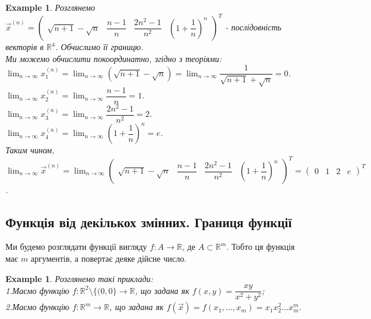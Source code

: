 \documentclass[a4paper, 10pt]{article}
\def\huge{\displaystyle}
\theoremstyle{theoremdd}
\theoremstyle{theoremdd}
\theoremstyle{theoremdd}
\theoremstyle{theoremdd}
\newtheorem{example}[theorem]{Example}
\theoremstyle{theoremdd}
\theoremstyle{theoremdd}
\theoremstyle{theoremdd}
\theoremstyle{theoremdd}
\begin{document}
\begin{example}
Розглянемо $\vec{x}^{(n)} = \begin{pmatrix}
\sqrt{n+1}-\sqrt{n} & \dfrac{n-1}{n} & \dfrac{2n^2-1}{n^2} & \left( 1 + \dfrac{1}{n} \right)^n
\end{pmatrix}^T$ - послідовність векторів в $\mathbb{R}^4$. Обчислимо її границю.\\
Ми можемо обчислити покоординатно, згідно з теоріями:\\
$\huge\lim_{n \to \infty} x_1^{(n)} = \lim_{n \to \infty} (\sqrt{n+1}-\sqrt{n}) = \lim_{n \to \infty} \dfrac{1}{\sqrt{n+1}+\sqrt{n}} = 0$.\\
$\huge\lim_{n \to \infty} x_2^{(n)} = \lim_{n \to \infty} \dfrac{n-1}{n} = 1$.\\
$\huge\lim_{n \to \infty} x_3^{(n)} = \lim_{n \to \infty} \dfrac{2n^2-1}{n^2} = 2$.\\
$\huge\lim_{n \to \infty} x_4^{(n)} = \lim_{n \to \infty} \left( 1 + \dfrac{1}{n}\right)^n = e$.\\
Таким чином, $\huge\lim_{n \to \infty} \vec{x}^{(n)} = \lim_{n \to \infty} \begin{pmatrix}
\sqrt{n+1}-\sqrt{n} & \dfrac{n-1}{n} & \dfrac{2n^2-1}{n^2} & \left( 1 + \dfrac{1}{n} \right)^n
\end{pmatrix}^T = \begin{pmatrix}
0 & 1 & 2 & e
\end{pmatrix}^T$.
\end{example}

\subsection{Функція від декількох змінних. Границя функції}
Ми будемо розглядати функції вигляду $f: A \to \mathbb{R}$, де $A \subset \mathbb{R}^m$. Тобто ця функція має $m$ аргументів, а повертає деяке дійсне число.

\begin{example} Розглянемо такі приклади:\\
1.Маємо функцію $f: \mathbb{R}^2 \setminus \{(0,0\} \to \mathbb{R}$, що задана як $f(x,y) = \dfrac{xy}{x^2+y^2}$;\\
2.Маємо функцію $f: \mathbb{R}^m \to \mathbb{R}$, що задана як $f(\vec{x}) = f(x_1,\dots,x_m) = x_1 x_2^2 \dots x_m^m$.
\end{example}
\end{document}
